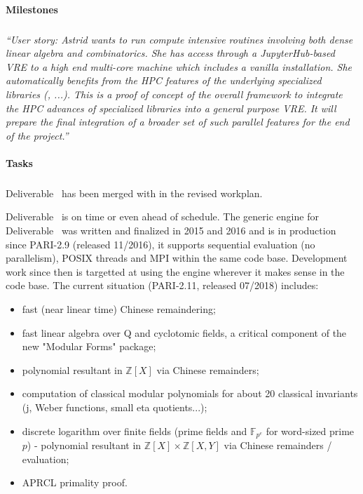 \paragraph{Milestones}

\subparagraph{}

\emph{“User story: Astrid wants to run compute intensive routines
    involving both dense linear algebra and combinatorics. She has
    access through a JupyterHub-based VRE to a high end multi-core
    machine which includes a vanilla \Sage installation. She
    automatically benefits from the HPC features of the underlying
    specialized libraries (\Linbox, ...). This is a proof of concept
    of the overall framework to integrate the HPC advances of
    specialized libraries into a general purpose VRE.
    It will prepare the final integration of a broader set of such
    parallel features for the end of the project.”}

\paragraph{Tasks}

\subparagraph{}
Deliverable~ has been merged
 with  in the revised workplan.

Deliverable~ is on time or even ahead of schedule.
The generic engine for Deliverable~ was written and
finalized in 2015 and 2016 and is in production since PARI-2.9 (released
11/2016), it supports sequential evaluation (no parallelism), POSIX threads and
MPI within the same code base.
Development work since then is targetted at using the engine wherever it makes
sense in the code base. The current situation (PARI-2.11, released 07/2018)
includes:
\begin{itemize}
\item fast (near linear time) Chinese remaindering;
\item fast linear algebra over Q and cyclotomic fields, a critical component of
the new "Modular Forms" package;
\item polynomial resultant in $\mathbb{Z}[X]$ via Chinese remainders;
\item computation of classical modular polynomials for about 20 classical
invariants (j, Weber functions, small eta quotients...);
\item discrete logarithm over finite fields (prime fields and
$\mathbb{F}_{p^e}$ for word-sized prime $p$) - polynomial resultant in
$\mathbb{Z}[X] \times \mathbb{Z}[X,Y]$ via 
Chinese remainders / evaluation;
\item APRCL primality proof.
\end{itemize}

